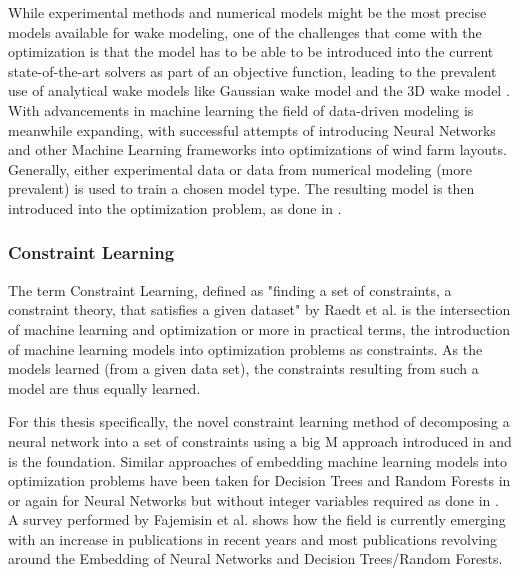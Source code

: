 While experimental methods and numerical models might be the most precise models available for wake modeling, one of the challenges that come with the optimization is that the model has to be able to be introduced into the current state-of-the-art solvers as part of an objective function, leading to the prevalent use of analytical wake models like Gaussian wake model and the 3D wake model  \cite{WANG2024118508}. With advancements in machine learning the field of data-driven modeling is meanwhile expanding, with successful attempts of introducing Neural Networks and other Machine Learning frameworks into optimizations of wind farm layouts. Generally, either experimental data or data from numerical modeling (more prevalent) is used to train  a chosen model type. The resulting model is then introduced into the optimization problem, as done in \cite{YANG2023119240} \cite{wes-9-869-2024} \cite{TI2020114025} \cite{TI2021618}. 

\subsubsection{Constraint Learning}

The term Constraint Learning, defined as "finding a set of constraints, a constraint theory, that satisfies a given dataset" by Raedt et al. is the intersection of machine learning and optimization or more in practical terms, the introduction of machine learning models into optimization problems as constraints. As the models learned (from a given data set), the constraints resulting from such a model are thus equally learned. \cite{de2018learning} 

For this thesis specifically, the novel constraint learning method of decomposing a neural network into a set of constraints using a big M approach introduced in \cite{ALCANTARA2023120895} and \cite{ALCANTARA2025127876} is the foundation. Similar approaches of embedding machine learning models into optimization problems have been taken for Decision Trees and Random Forests in \cite{preprintBonfiettiEmbeddDecisionTrees} or again for Neural Networks but without integer variables required as done in \cite{dealba2024reformulationembeddingneuralnetwork}. A survey performed by Fajemisin et al.\cite{FAJEMISIN20241} shows how the field is currently emerging with an increase in publications in recent years and most publications revolving around the Embedding of Neural Networks and Decision Trees/Random Forests.
